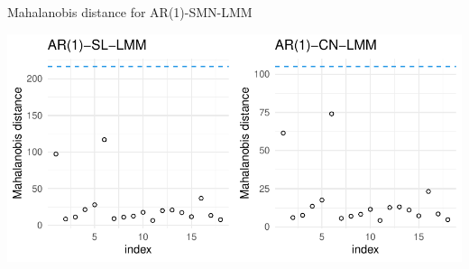 \begin{frame}[fragile]{Mahalanobis distance for AR(1)-SMN-LMM}
\protect\hypertarget{mahalanobis-distance-for-ar1-smn-lmm}{}

\scriptsize

\begin{Shaded}
\begin{Highlighting}[]
\NormalTok{(}\NormalTok{(} \NormalTok{)}\OperatorTok{+}
\StringTok{               }\NormalTok{(}\NormalTok{),}
             \NormalTok{(} \NormalTok{)}\OperatorTok{+}
\StringTok{               }\NormalTok{(}\NormalTok{),}
             \NormalTok{)}
\end{Highlighting}
\end{Shaded}

\begin{center}\includegraphics[width=0.8\linewidth]{codes_files/figure-beamer/mahal1-1} \end{center}

\end{frame}

